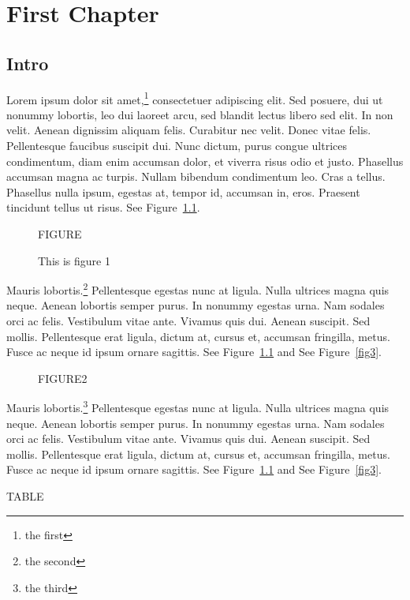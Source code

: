 \documentclass{report}
\begin{document}
\tableofcontents
\listoffigures
\chapter{First Chapter}

\section{Intro}

Lorem ipsum dolor sit amet,\footnote{the first} consectetuer adipiscing elit. Sed posuere, dui ut
nonummy lobortis, leo dui laoreet arcu, sed blandit lectus libero sed elit. In
non velit. Aenean dignissim aliquam felis. Curabitur nec velit. Donec vitae
felis. Pellentesque faucibus suscipit dui. Nunc dictum, purus congue ultrices
condimentum, diam enim accumsan dolor, et viverra risus odio et justo. Phasellus
accumsan magna ac turpis. Nullam bibendum condimentum leo. Cras a tellus.
Phasellus nulla ipsum, egestas at, tempor id, accumsan in, eros. Praesent
tincidunt tellus ut risus.  See Figure~\ref{fig1}.

\begin{figure}[h]
\begin{center}
{\Large FIGURE}
\label{fig1}
\caption{This is figure 1}
\end{center}
\end{figure}

Mauris lobortis.\footnote{the second} Pellentesque egestas nunc at ligula. Nulla ultrices magna quis
neque. Aenean lobortis semper purus. In nonummy egestas urna. Nam sodales orci
ac felis. Vestibulum vitae ante. Vivamus quis dui. Aenean suscipit. Sed mollis.
Pellentesque erat ligula, dictum at, cursus et, accumsan fringilla, metus. Fusce
ac neque id ipsum ornare sagittis.  See Figure~\ref{fig1} and See Figure~\ref{fig3}.

\begin{figure}[ht]
\centering
{\Large FIGURE2}
\end{figure}

Mauris lobortis.\footnote{the third} Pellentesque egestas nunc at ligula. Nulla ultrices magna quis
neque. Aenean lobortis semper purus. In nonummy egestas urna. Nam sodales orci
ac felis. Vestibulum vitae ante. Vivamus quis dui. Aenean suscipit. Sed mollis.
Pellentesque erat ligula, dictum at, cursus et, accumsan fringilla, metus. Fusce
ac neque id ipsum ornare sagittis.  See Figure~\ref{fig1} and See Figure~\ref{fig3}.

\begin{table}[ht]
\centering
{\Large TABLE}
\end{table}
\end{document}
